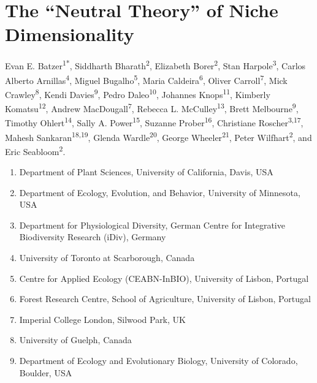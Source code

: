 \documentclass[twoside,12pt,final]{ucthesis-CA2012}
\providecommand{\tightlist}{%
  \setlength{\itemsep}{0pt}\setlength{\parskip}{0pt}}
\begin{document}
\begin{ucmainmatter}

\hypertarget{the-neutral-theory-of-niche-dimensionality}{%
\chapter{The ``Neutral Theory'' of Niche Dimensionality}\label{the-neutral-theory-of-niche-dimensionality}}


Evan E. Batzer\textsuperscript{1*},
Siddharth Bharath\textsuperscript{2},
Elizabeth Borer\textsuperscript{2},
Stan Harpole\textsuperscript{3},
Carlos Alberto Arnillas\textsuperscript{4},
Miguel Bugalho\textsuperscript{5},
Maria Caldeira\textsuperscript{6},
Oliver Carroll\textsuperscript{7},
Mick Crawley\textsuperscript{8},
Kendi Davies\textsuperscript{9},
Pedro Daleo\textsuperscript{10},
Johannes Knops\textsuperscript{11},
Kimberly Komatsu\textsuperscript{12},
Andrew MacDougall\textsuperscript{7},
Rebecca L. McCulley\textsuperscript{13},
Brett Melbourne\textsuperscript{9},
Timothy Ohlert\textsuperscript{14},
Sally A. Power\textsuperscript{15},
Suzanne Prober\textsuperscript{16},
Christiane Roscher\textsuperscript{3,17},
Mahesh Sankaran\textsuperscript{18,19},
Glenda Wardle\textsuperscript{20},
George Wheeler\textsuperscript{21},
Peter Wilfhart\textsuperscript{2},
and Eric Seabloom\textsuperscript{2}.
\begin{enumerate}
\def\labelenumi{\arabic{enumi}.}
\tightlist
\item
  Department of Plant Sciences, University of California, Davis, USA
\item
  Department of Ecology, Evolution, and Behavior, University of Minnesota, USA
\item
  Department for Physiological Diversity, German Centre for Integrative Biodiversity Research (iDiv), Germany
\item
  University of Toronto at Scarborough, Canada
\item
  Centre for Applied Ecology (CEABN-InBIO), University of Lisbon, Portugal
\item
  Forest Research Centre, School of Agriculture, University of Lisbon, Portugal
\item
  Imperial College London, Silwood Park, UK
\item
  University of Guelph, Canada
\item
  Department of Ecology and Evolutionary Biology, University of Colorado, Boulder, USA

\end{enumerate}
\end{ucmainmatter}
\end{document}
